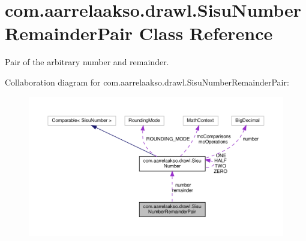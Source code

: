 \hypertarget{classcom_1_1aarrelaakso_1_1drawl_1_1_sisu_number_remainder_pair}{}\section{com.\+aarrelaakso.\+drawl.\+Sisu\+Number\+Remainder\+Pair Class Reference}
\label{classcom_1_1aarrelaakso_1_1drawl_1_1_sisu_number_remainder_pair}


Pair of the arbitrary number and remainder.  




Collaboration diagram for com.\+aarrelaakso.\+drawl.\+Sisu\+Number\+Remainder\+Pair\+:\nopagebreak
\begin{figure}[H]
\begin{center}
\leavevmode
\includegraphics[width=350pt]{d3/d6a/classcom_1_1aarrelaakso_1_1drawl_1_1_sisu_number_remainder_pair__coll__graph}
\end{center}
\end{figure}
